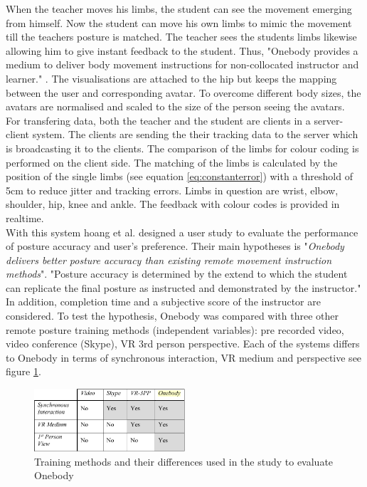 When the teacher moves his limbs, the student can see the movement emerging from himself. Now the student can move his own limbs to mimic the movement till the teachers posture is matched. The teacher sees the students limbs likewise allowing him to give instant feedback to the student. Thus, "Onebody provides a medium to deliver body movement instructions for non-collocated instructor and learner." \todo. The visualisations are attached to the hip but keeps the mapping between the user and corresponding avatar. To overcome different body sizes, the avatars are normalised and scaled to the size of the person seeing the avatars.\\
For transfering data, both the teacher and the student are clients in a server-client system. The clients are sending the their tracking data to the server which is broadcasting it to the clients. The comparison of the limbs for colour coding is performed on the client side. The matching of the limbs is calculated by the position of the single limbs (see equation \eqref{eq:constanterror}) with a threshold of 5cm to reduce jitter and tracking errors. Limbs in question are wrist, elbow, shoulder, hip, knee and ankle. The feedback with colour codes is provided in realtime.\\
With this system hoang et al. designed a user study to evaluate the performance of posture accuracy and user's preference. Their main hypotheses is "\textit{Onebody delivers better posture accuracy than existing remote movement instruction methods}". "Posture accuracy is determined by the extend to which the student can replicate the final posture as instructed and demonstrated by the instructor." In addition, completion time and a subjective score of the instructor are considered.
To test the hypothesis, Onebody was compared with three other remote posture training methods (independent variables): pre recorded video, video conference (Skype), VR 3rd person perspective. Each of the systems differs to Onebody in terms of synchronous interaction, VR medium and perspective see figure \ref{fig:ob2}.
\begin{figure}
	\centering
	\includegraphics[width=0.5\textwidth]{img/onebody_training_methods.PNG}
	\caption{Training methods and their differences used in the study to evaluate Onebody \cite{Reinoso2016}}
	\label{fig:ob2}
\end{figure}
